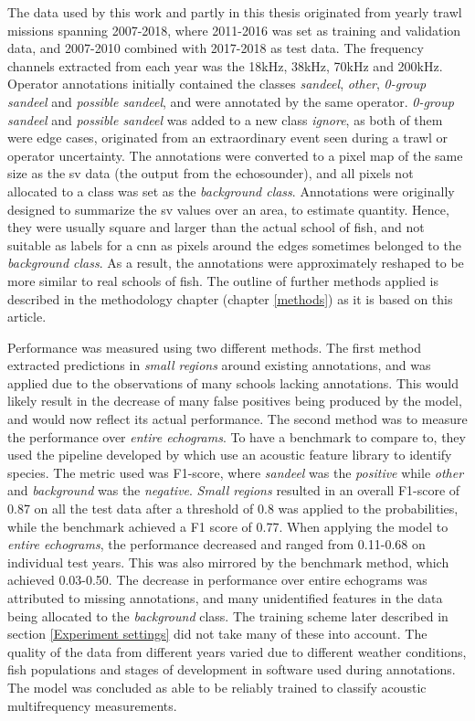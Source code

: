     The data used by this work and partly in this thesis originated from yearly trawl missions spanning 2007-2018\cite{brautaset2020acoustic}, where 2011-2016 was set as training and validation data, and 2007-2010 combined with 2017-2018 as test data. The frequency channels extracted from each year was the 18kHz, 38kHz, 70kHz and 200kHz. Operator annotations initially contained the classes \textit{sandeel}, \textit{other}, \textit{0-group sandeel} and \textit{possible sandeel}, and were annotated by the same operator. \textit{0-group sandeel} and \textit{possible sandeel} was added to a new class \textit{ignore}, as both of them were edge cases, originated from an extraordinary event seen during a trawl or operator uncertainty. The annotations were converted to a pixel map of the same size as the \gls{sv} data (the output from the echosounder), and all pixels not allocated to a class was set as the \textit{background class}. Annotations were originally designed to summarize the \gls{sv} values over an area, to estimate quantity. Hence, they were usually square and larger than the actual school of fish, and not suitable as labels for a \gls{cnn} as pixels around the edges sometimes belonged to the \textit{background class}. As a result, the annotations were approximately reshaped to be more similar to real schools of fish. The outline of further methods applied is described in the methodology chapter (chapter \ref{methods}) as it is based on this article.
    
    Performance was measured using two different methods\cite{brautaset2020acoustic}. The first method extracted predictions in \textit{small regions} around existing annotations, and was applied due to  the observations of many schools lacking annotations. This would likely result in the decrease of many false positives being produced by the model, and would now reflect its actual performance. The second method was to measure the performance over \textit{entire echograms}. To have a benchmark to compare to, they used the pipeline developed by \citet{korneliussen2016acoustic} which use an acoustic feature library to identify species. The metric used was F1-score, where \textit{sandeel} was the \textit{positive}   while \textit{other} and \textit{background} was the \textit{negative}. \textit{Small regions} resulted in an overall F1-score of 0.87 on all the test data after a threshold of 0.8 was applied to the probabilities, while the benchmark achieved a F1 score of 0.77. When applying the model to \textit{entire echograms}, the performance decreased and ranged from 0.11-0.68 on individual test years. This was also mirrored by the benchmark method, which achieved 0.03-0.50. The decrease in performance over entire echograms was attributed to missing annotations, and many unidentified features in the data being allocated to the \textit{background} class. The training scheme later described in section \ref{Experiment settings} did not take many of these into account. The quality of the data from different years varied due to different weather conditions, fish populations and stages of development in software used during annotations. The model was concluded as able to be reliably trained to classify acoustic multifrequency measurements\cite{brautaset2020acoustic}.
    

